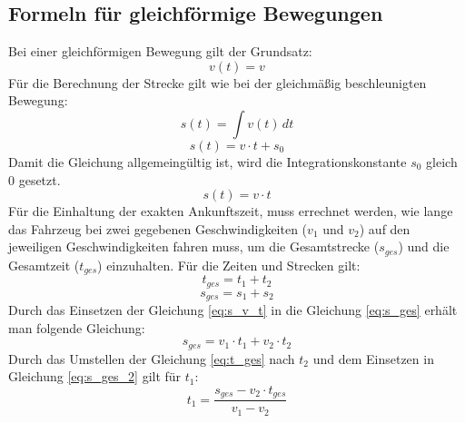\subsection{Formeln für gleichförmige Bewegungen} \label{formulaGleichfoermig}
Bei einer gleichförmigen Bewegung gilt der Grundsatz:
\begin{equation}
v(t) = v
\end{equation}
Für die Berechnung der Strecke gilt wie bei der gleichmäßig beschleunigten Bewegung:
\begin{equation}
s(t) = \int v(t) \,dt
\end{equation}
\begin{equation}
s(t) =v \cdot t + s_{0}
\end{equation}
Damit die Gleichung allgemeingültig ist, wird die Integrationskonstante $s_{0}$ gleich 0 gesetzt.
\begin{equation}
s(t) =v \cdot t
\label{eq:s_v_t}
\end{equation}
Für die Einhaltung der exakten Ankunftszeit, muss errechnet werden, wie lange das Fahrzeug bei zwei gegebenen Geschwindigkeiten ($v_1$ und $v_2$) auf den jeweiligen Geschwindigkeiten fahren muss, um die Gesamtstrecke ($s_{ges}$) und die Gesamtzeit ($t_{ges}$) einzuhalten. Für die Zeiten und Strecken gilt:
\begin{equation}
\label{eq:t_ges}
t_{ges} = t_{1} + t_{2}
\end{equation}
\begin{equation}
\label{eq:s_ges}
s_{ges} = s_{1} + s_{2}
\end{equation}
Durch das Einsetzen der Gleichung \eqref{eq:s_v_t} in die Gleichung \eqref{eq:s_ges} erhält man folgende Gleichung:
\begin{equation}
\label{eq:s_ges_2}
s_{ges} = v_{1} \cdot t_{1} + v_{2} \cdot t_{2}
\end{equation}
Durch das Umstellen der Gleichung \eqref{eq:t_ges} nach $t_{2}$ und dem Einsetzen in Gleichung \eqref{eq:s_ges_2} gilt für $t_{1}$:
\begin{equation}
\label{eq:t_1_tuning}
t_{1} = \frac{s_{ges} - v_{2} \cdot t_{ges}}{v_{1} - v_{2}}
\end{equation}